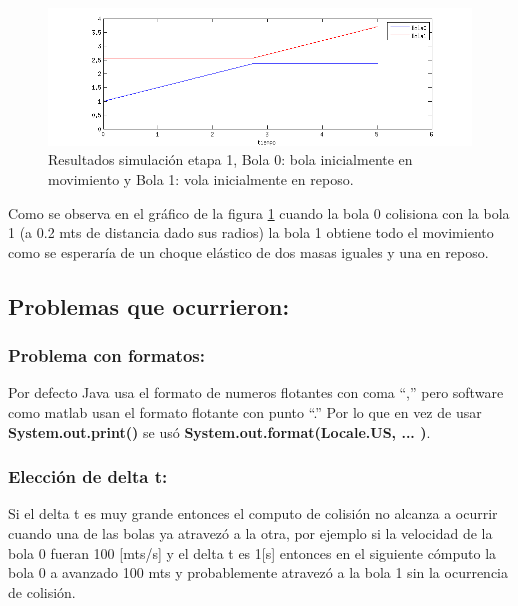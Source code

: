 \documentclass[a4paper,10pt]{article}
\begin{document}
\begin{figure}[H]
 \centering
 \includegraphics[scale=0.5]{./simulacion_etapa1.png}
 \caption{Resultados simulación etapa 1, Bola 0: bola inicialmente en movimiento y Bola 1: vola inicialmente en reposo.}
  \label{etapa1.2}
\end{figure}

Como se observa en el gráfico de la figura \ref{etapa1.2} cuando la bola 0 colisiona con la bola 1 (a 0.2 mts de distancia dado sus radios) 
la bola 1 obtiene todo el movimiento como se esperaría de un choque elástico de dos masas iguales y una en reposo.\newline

\subsection{Problemas que ocurrieron:}

\subsubsection{Problema con formatos:}


Por defecto Java usa el formato de numeros flotantes con coma ``,'' pero software como matlab usan el formato flotante con punto ``.''
Por lo que en vez de usar \textbf{System.out.print()} se usó \textbf{System.out.format(Locale.US, ... )}.\newline


\subsubsection{Elección de delta t:}


Si el delta t es muy grande entonces el computo de colisión no alcanza a ocurrir cuando una de las bolas ya atravezó a la otra, por ejemplo
si la velocidad de la bola 0 fueran 100 [mts/s] y el delta t es 1[s] entonces en el siguiente cómputo la bola 0 a avanzado 100 mts y probablemente
atravezó a la bola 1 sin la ocurrencia de colisión.\newline
\end{document}
